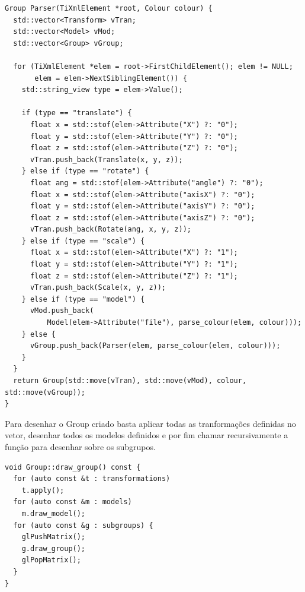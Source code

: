 \documentclass[a4paper]{report}
\begin{document}
\begin{lstlisting}
Group Parser(TiXmlElement *root, Colour colour) {
  std::vector<Transform> vTran;
  std::vector<Model> vMod;
  std::vector<Group> vGroup;

  for (TiXmlElement *elem = root->FirstChildElement(); elem != NULL;
       elem = elem->NextSiblingElement()) {
    std::string_view type = elem->Value();

    if (type == "translate") {
      float x = std::stof(elem->Attribute("X") ?: "0");
      float y = std::stof(elem->Attribute("Y") ?: "0");
      float z = std::stof(elem->Attribute("Z") ?: "0");
      vTran.push_back(Translate(x, y, z));
    } else if (type == "rotate") {
      float ang = std::stof(elem->Attribute("angle") ?: "0");
      float x = std::stof(elem->Attribute("axisX") ?: "0");
      float y = std::stof(elem->Attribute("axisY") ?: "0");
      float z = std::stof(elem->Attribute("axisZ") ?: "0");
      vTran.push_back(Rotate(ang, x, y, z));
    } else if (type == "scale") {
      float x = std::stof(elem->Attribute("X") ?: "1");
      float y = std::stof(elem->Attribute("Y") ?: "1");
      float z = std::stof(elem->Attribute("Z") ?: "1");
      vTran.push_back(Scale(x, y, z));
    } else if (type == "model") {
      vMod.push_back(
          Model(elem->Attribute("file"), parse_colour(elem, colour)));
    } else {
      vGroup.push_back(Parser(elem, parse_colour(elem, colour)));
    }
  }
  return Group(std::move(vTran), std::move(vMod), colour, std::move(vGroup));
}
\end{lstlisting}
Para desenhar o Group criado basta aplicar todas as tranformações definidas no
vetor, desenhar todos os modelos definidos e por fim chamar recursivamente a
função para desenhar sobre os subgrupos.

\begin{lstlisting}
void Group::draw_group() const {
  for (auto const &t : transformations)
    t.apply();
  for (auto const &m : models)
    m.draw_model();
  for (auto const &g : subgroups) {
    glPushMatrix();
    g.draw_group();
    glPopMatrix();
  }
}
\end{lstlisting}
\end{document}
